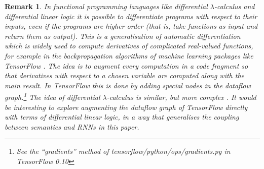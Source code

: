 \documentclass[english,letter paper,12pt,leqno]{article}
\theoremstyle{example}
\newtheorem{definition}[theorem]{Definition}
\newtheorem{remark}[theorem]{Remark}
\numberwithin{equation}{section}
\DeclareMathOperator{\End}{End}
\begin{document}


\begin{remark} In functional programming languages like differential $\lambda$-calculus \cite{difflambda} and differential linear logic \cite{ehrhard-survey} it is possible to differentiate programs with respect to their inputs, even if the programs are higher-order (that is, take functions as input and return them as output). This is a generalisation of automatic differentiation \cite{griewank} which is widely used to compute derivatives of complicated real-valued functions, for example in the backpropagation algorithms of machine learning packages like TensorFlow \cite[\S 4.1]{tensorflow}. The idea is to augment every computation in a code fragment so that derivatives with respect to a chosen variable are computed along with the main result. In TensorFlow this is done by adding special nodes in the dataflow graph.\footnote{See the ``gradients'' method of tensorflow/python/ops/gradients.py in TensorFlow 0.10} The idea of differential $\lambda$-calculus is similar, but more complex \cite{manzyuk}. It would be interesting to explore augmenting the dataflow graph of TensorFlow directly with terms of differential linear logic, in a way that generalises the coupling between semantics and RNNs in this paper.
\end{remark}
\end{document}
